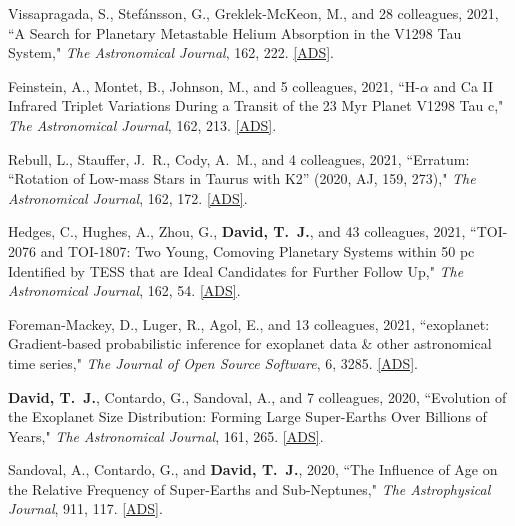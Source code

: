 \item {{Vissapragada}, S., {Stef{\'a}nsson}, G., {Greklek-McKeon}, M., and 28 colleagues}, 2021, ``{A Search for Planetary Metastable Helium Absorption in the V1298 Tau System}," \textit{The Astronomical Journal}, 162, 222. 
\href{https://ui.adsabs.harvard.edu/abs/2021AJ....162..222V/abstract}{[ADS]}.

\item {{Feinstein}, A., {Montet}, B., {Johnson}, M., and 5 colleagues}, 2021, ``{H-$\alpha$ and Ca II Infrared Triplet Variations During a Transit of the 23 Myr Planet V1298 Tau c}," \textit{The Astronomical Journal}, 162, 213. \href{https://ui.adsabs.harvard.edu/abs/2021AJ....162..213F/abstract}{[ADS]}.

\item {{Rebull}, L., {Stauffer}, J.~R., {Cody}, A.~M., and 4 colleagues}, 2021, ``{Erratum: ``Rotation of Low-mass Stars in Taurus with K2'' (2020, AJ, 159, 273)}," \textit{The Astronomical Journal}, 162, 172. \href{https://ui.adsabs.harvard.edu/abs/2021AJ....162..172R/abstract}{[ADS]}.

\item {{Hedges}, C., {Hughes}, A., {Zhou}, G., {\bf {David}, T.~J.}, and 43 colleagues}, 2021, ``{TOI-2076 and TOI-1807: Two Young, Comoving Planetary Systems within 50 pc Identified by TESS that are Ideal Candidates for Further Follow Up}," \textit{The Astronomical Journal}, 162, 54. \href{https://ui.adsabs.harvard.edu/abs/2021AJ....162...54H}{[ADS]}.

\item {{Foreman-Mackey}, D., {Luger}, R., {Agol}, E., and 13 colleagues}, 2021, ``{exoplanet: Gradient-based probabilistic inference for exoplanet data \& other astronomical time series}," \textit{The Journal of Open Source Software}, 6, 3285. \href{https://ui.adsabs.harvard.edu/abs/2021JOSS....6.3285F}{[ADS]}.

\item {\bf {David}, T.~J.}, {Contardo}, G., {Sandoval}, A., and 7 colleagues, 2020, ``{Evolution of the Exoplanet Size Distribution: Forming Large Super-Earths Over Billions of Years}," \textit{The Astronomical Journal}, 161, 265. \href{https://ui.adsabs.harvard.edu/abs/2021AJ....161..265D/abstract}{[ADS]}.

\item {Sandoval}, A., {Contardo}, G., and {\bf {David}, T.~J.}, 2020, ``{The Influence of Age on the Relative Frequency of Super-Earths and Sub-Neptunes}," \textit{The Astrophysical Journal}, 911, 117. \href{https://ui.adsabs.harvard.edu/abs/2021ApJ...911..117S}{[ADS]}.

